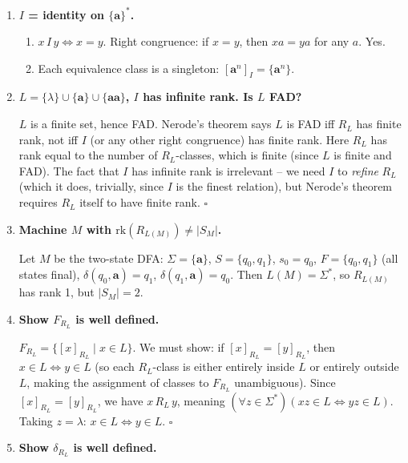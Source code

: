 \begin{enumerate}[{2.}1.]
\item \textbf{$I$ = identity on $\{\mathbf{a}\}^*$.}

\begin{enumerate}
\item $x\,I\,y\Leftrightarrow x=y$. Right congruence: if $x=y$, then $xa=ya$ for any $a$. Yes.
\item Each equivalence class is a singleton: $[\mathbf{a}^n]_I=\{\mathbf{a}^n\}$.
\end{enumerate}

\item \textbf{$L=\{\lambda\}\cup\{\mathbf{a}\}\cup\{\mathbf{aa}\}$, $I$ has infinite rank. Is $L$ FAD?}

$L$ is a finite set, hence FAD. Nerode's theorem says $L$ is FAD iff $R_L$ has finite rank, not iff $I$ (or any other right congruence) has finite rank. Here $R_L$ has rank equal to the number of $R_L$-classes, which is finite (since $L$ is finite and FAD). The fact that $I$ has infinite rank is irrelevant -- we need $I$ to \emph{refine} $R_L$ (which it does, trivially, since $I$ is the finest relation), but Nerode's theorem requires $R_L$ itself to have finite rank. $\square$

\item \textbf{Machine $M$ with $\mathrm{rk}(R_{L(M)})\neq |S_M|$.}

Let $M$ be the two-state DFA: $\Sigma=\{\mathbf{a}\}$, $S=\{q_0,q_1\}$, $s_0=q_0$, $F=\{q_0,q_1\}$ (all states final), $\delta(q_0,\mathbf{a})=q_1$, $\delta(q_1,\mathbf{a})=q_0$. Then $L(M)=\Sigma^*$, so $R_{L(M)}$ has rank 1, but $|S_M|=2$.

\item \textbf{Show $F_{R_L}$ is well defined.}

$F_{R_L}=\{[x]_{R_L}\mid x\in L\}$. We must show: if $[x]_{R_L}=[y]_{R_L}$, then $x\in L\Leftrightarrow y\in L$ (so each $R_L$-class is either entirely inside $L$ or entirely outside $L$, making the assignment of classes to $F_{R_L}$ unambiguous). Since $[x]_{R_L}=[y]_{R_L}$, we have $x\,R_L\,y$, meaning $(\forall z\in\Sigma^*)(xz\in L\Leftrightarrow yz\in L)$. Taking $z=\lambda$: $x\in L\Leftrightarrow y\in L$. $\square$

\item \textbf{Show $\delta_{R_L}$ is well defined.}


\end{enumerate}
